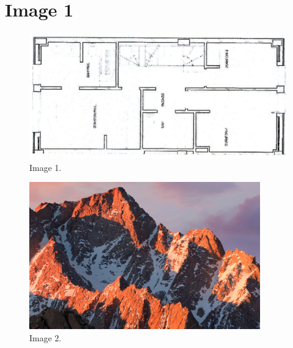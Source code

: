 \documentclass{article} %
\begin{document}
\section{Image 1}

\begin{figure}[H]
	\begin{changemargin}{-2.5cm}{0.5cm}
		\includegraphics[width=17cm]{maig_18/img1}
		\centering
		\color{blue}
		\caption{Image 1.}\label{visina8}
	\end{changemargin}
\end{figure}

\begin{figure}[H]
	\includegraphics[width=10cm]{maig_18/img2}
	\centering
	\color{blue}
	\caption{Image 2.}\label{visina8}
\end{figure}
\end{document}
